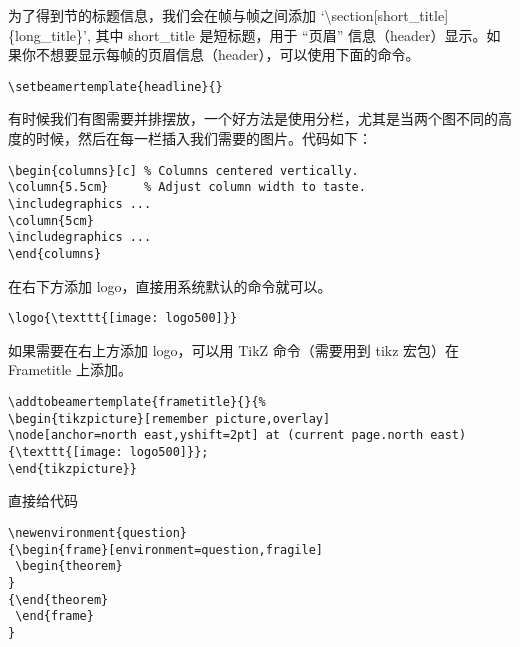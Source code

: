 为了得到节的标题信息，我们会在帧与帧之间添加
`\textbackslash{}section{[}short\_title{]}\{long\_title\}', 其中
short\_title 是短标题，用于 ``页眉''
信息（header）显示。如果你不想要显示每帧的页眉信息（header），可以使用下面的命令。

\begin{verbatim}
\setbeamertemplate{headline}{}
\end{verbatim}



有时候我们有图需要并排摆放，一个好方法是使用分栏，尤其是当两个图不同的高度的时候，然后在每一栏插入我们需要的图片。代码如下：

\begin{verbatim}
\begin{columns}[c] % Columns centered vertically.
\column{5.5cm}     % Adjust column width to taste.
\includegraphics ...
\column{5cm}
\includegraphics ...
\end{columns}
\end{verbatim}



在右下方添加 logo，直接用系统默认的命令就可以。

\begin{verbatim}
\logo{\texttt{[image: logo500]}}
\end{verbatim}

如果需要在右上方添加 logo，可以用 TikZ 命令（需要用到 tikz 宏包）在
Frametitle 上添加。

\begin{verbatim}
\addtobeamertemplate{frametitle}{}{%
\begin{tikzpicture}[remember picture,overlay]
\node[anchor=north east,yshift=2pt] at (current page.north east) {\texttt{[image: logo500]}};
\end{tikzpicture}}
\end{verbatim}



直接给代码

\begin{verbatim}
\newenvironment{question}
{\begin{frame}[environment=question,fragile]
 \begin{theorem}
}
{\end{theorem}
 \end{frame}
}
\end{verbatim}




